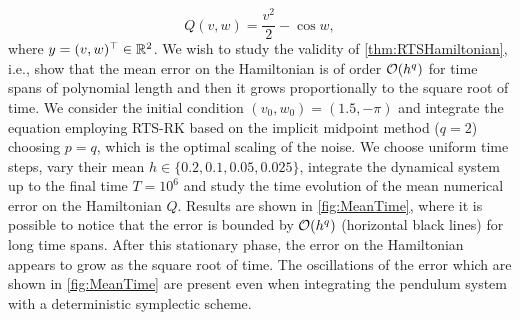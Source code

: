 \documentclass[10pt]{article}
\begin{document}
\begin{equation}
Q(v, w) = \frac{v^2}{2} - \cos w,
\end{equation}
where $y = (v, w)^\top \in \mathbb{R}^2$. We wish to study the validity of \cref{thm:RTSHamiltonian}, i.e., show that the mean error on the Hamiltonian is of order $\mathcal{O}(h^q)$ for time spans of polynomial length and then it grows proportionally to the square root of time. We consider the initial condition $(v_0, w_0) = (1.5, -\pi)$ and integrate the equation employing RTS-RK based on the implicit midpoint method ($q = 2$) choosing $p = q$, which is the optimal scaling of the noise. We choose uniform time steps, vary their mean $h \in \{0.2, 0.1, 0.05, 0.025\}$, integrate the dynamical system up to the final time $T = 10^6$ and study the time evolution of the mean numerical error on the Hamiltonian $Q$. Results are shown in \cref{fig:MeanTime}, where it is possible to notice that the error is bounded by $\mathcal{O}(h^q)$ (horizontal black lines) for long time spans. After this stationary phase, the error on the Hamiltonian appears to grow as the square root of time. The oscillations of the error which are shown in \cref{fig:MeanTime} are present even when integrating the pendulum system with a deterministic symplectic scheme. 
\end{document}
